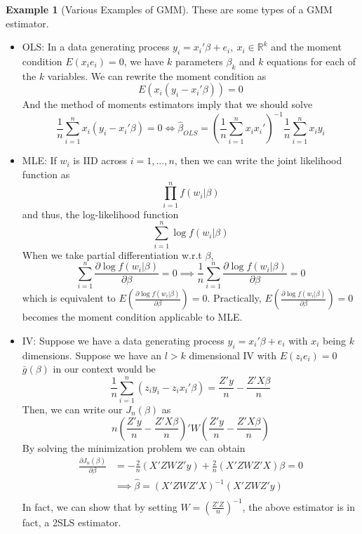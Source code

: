 \documentclass[12pt]{article}
\theoremstyle{definition}
\theoremstyle{property}
\theoremstyle{assumption}
\theoremstyle{example}
\newtheorem{example}{Example}[section]
\theoremstyle{comment}
\begin{document}
\begin{mdframed}[backgroundcolor=yellow!5] 
\begin{example}[Various Examples of GMM] These are some types of a GMM estimator. 
\begin{itemize}
\item OLS: In a data generating process $y_i = x_i'\beta+e_i,\ x_i\in\mathbb{R}^k$ and the moment condition $E(x_ie_i)=0$, we have $k$ parameters $\beta_k$  and $k$ equations for each of the $k$ variables. We can rewrite the moment condition as
\[
E(x_i(y_i-x_i'\beta))=0
\]
And the method of moments estimators imply that we should solve 
\[
\frac{1}{n}\sum_{i=1}^nx_i(y_i-x_i'\beta)=0\iff \hat{\beta}_{OLS}=\left(\frac{1}{n}\sum_{i=1}^n x_ix_i'\right)^{-1}\frac{1}{n}\sum_{i=1}^n x_iy_i
\]
\item MLE: If $w_i$ is IID across $i=1,...,n$, then we can write the joint likelihood function as
\[
\prod_{i=1}^nf(w_i|\beta)
\]
and thus, the log-likelihood function
\[
\sum_{i=1}^n \log f(w_i|\beta)
\]
When we take partial differentiation w.r.t $\beta$, 
\[
\sum_{i=1}^n \frac{\partial \log f(w_i|\beta)}{\partial \beta}=0 \implies \frac{1}{n}\sum_{i=1}^n \frac{\partial \log f(w_i|\beta)}{\partial \beta}=0 
\]
which is equivalent to $E\left(\frac{\partial \log f(w_i|\beta)}{\partial \beta}\right)=0$. Practically, $E\left(\frac{\partial \log f(w_i|\beta)}{\partial \beta}\right)=0$ becomes the moment condition applicable to MLE.
\item IV: Suppose we have a data generating process $y_i=x_i'\beta+e_i$ with $x_i$ being $k$ dimensions.  Suppose we have an $l>k$ dimensional IV with $E(z_ie_i)=0$  $\bar{g}(\beta)$ in our context would be
\[
\frac{1}{n}\sum_{i=1}^n(z_iy_i-z_ix_i'\beta) = \frac{Z'y}{n}-\frac{Z'X\beta}{n}
\]
Then, we can write our $J_n(\beta)$ as
\[
n\left(\frac{Z'y}{n}-\frac{Z'X\beta}{n} \right)'W\left(\frac{Z'y}{n}-\frac{Z'X\beta}{n} \right)
\]
By solving the minimization problem we can obtain
\[
\begin{aligned}
\frac{\partial J_n(\beta)}{\partial \beta}&=-\frac{2}{n}(X'ZWZ'y)+\frac{2}{n}(X'ZWZ'X)\beta=0\\
&\implies\hat{\beta}=(X'ZWZ'X)^{-1}(X'ZWZ'y)\\
\end{aligned}
\]
In fact, we can show that by setting $W=\left(\frac{Z'Z}{n}\right)^{-1}$, the above estimator is in fact, a 2SLS estimator. 
\end{itemize}
\end{example}
\end{mdframed}
\end{document}
